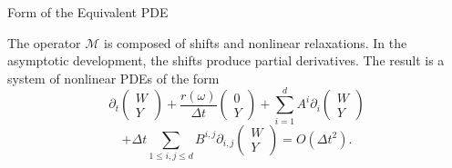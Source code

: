 \documentclass[english]{beamer}
\begin{document}
%
\begin{frame}{Form of the Equivalent PDE}

The operator $\mathcal{M}$ is composed of shifts and nonlinear relaxations. In the asymptotic development, the shifts produce partial derivatives. The result is a system of nonlinear PDEs of the form
\[
\partial_{t}\left(\begin{array}{c}
W\\
Y
\end{array}\right)+\frac{r(\omega)}{\Delta t}\left(\begin{array}{c}
0\\
Y
\end{array}\right)+\sum_{i=1}^{d}A^{i}\partial_{i}\left(\begin{array}{c}
W\\
Y
\end{array}\right)
\]
\begin{equation}
+\Delta t\sum_{1\leq i,j\leq d}B^{i,j}\partial_{i,j}\left(\begin{array}{c}
W\\
Y
\end{array}\right)=O(\Delta t^{2}).\label{eq:forme_EDP_eq}
\end{equation}

\end{frame}
%


\end{document}
